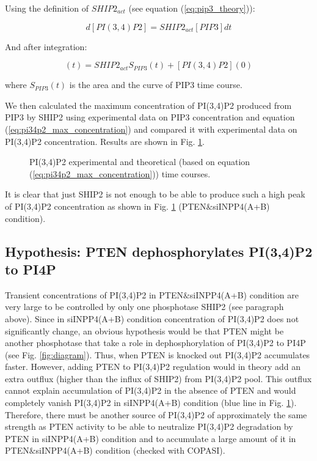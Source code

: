 \documentclass[12pt]{article} %
\begin{document}
Using the definition of \(SHIP2_{act}\) (see equation (\ref{eq:pip3_theory})):

\[
 d [PI(3,4)P2] = SHIP2_{act}[PIP3]d t
\]

And after integration:

\begin{equation}
 [PI(3,4)P2](t) = SHIP2_{act}S_{PIP3}(t) + [PI(3,4)P2](0)
 \label{eq:pi34p2_max_concentration}
\end{equation}

where \(S_{PIP3}(t)\) is the area and the curve of PIP3 time course.

We then calculated the maximum concentration of PI(3,4)P2 produced from PIP3 by SHIP2 using experimental data on PIP3 concentration and equation (\ref{eq:pi34p2_max_concentration}) and compared it with experimental data on PI(3,4)P2 concentration. Results are shown in Fig. \ref{fig:pi34p2_production_no_pten}.

\begin{figure}[H] %
\caption{PI(3,4)P2 experimental and theoretical (based on equation (\ref{eq:pi34p2_max_concentration})) time courses.}
\label{fig:pi34p2_production_no_pten}
\end{figure}

It is clear that just SHIP2 is not enough to be able to produce such a high peak of PI(3,4)P2 concentration as shown in Fig. \ref{fig:pi34p2_production_no_pten} (PTEN\(\&\)siINPP4(A+B) condition).

\subsection{Hypothesis: PTEN dephosphorylates PI(3,4)P2 to PI4P} %

Transient concentrations of PI(3,4)P2 in PTEN\(\&\)siINPP4(A+B) condition are very large to be controlled by only one phosphotase SHIP2 (see paragraph above). Since in siINPP4(A+B) condition concentration of PI(3,4)P2 does not significantly change, an obvious hypothesis would be that PTEN might be another phosphotase that take a role in dephosphorylation of PI(3,4)P2 to PI4P (see Fig. \ref{fig:diagram}). Thus, when PTEN is knocked out PI(3,4)P2 accumulates faster. However, adding PTEN to PI(3,4)P2 regulation would in theory add an extra outflux (higher than the influx of SHIP2) from PI(3,4)P2 pool. This outflux cannot explain accumulation of PI(3,4)P2 in the absence of PTEN and would completely vanish PI(3,4)P2 in siINPP4(A+B) condition (blue line in Fig. \ref{fig:pi34p2_production_no_pten}). Therefore, there must be another source of PI(3,4)P2 of approximately the same strength as PTEN activity to be able to neutralize PI(3,4)P2 degradation by PTEN in siINPP4(A+B) condition and to accumulate a large amount of it in PTEN\(\&\)siINPP4(A+B) condition (checked with COPASI).
\end{document}
